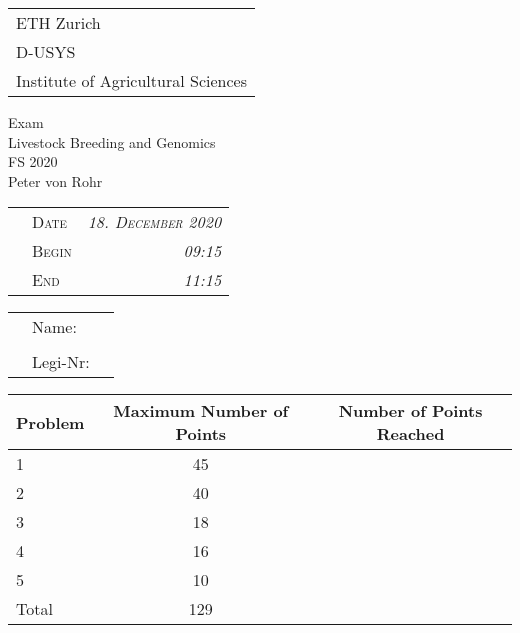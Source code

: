 \documentclass[
]{article}
\author{}
\date{\vspace{-2.5em}}
\begin{document}
\thispagestyle{empty}

\begin{tabular}{l}
ETH Zurich \\
D-USYS\\
Institute of Agricultural Sciences\\
\end{tabular}

\vspace{15ex}
\begin{center}
\huge
Exam\\ \vspace{1ex}
Livestock Breeding and Genomics \\  \vspace{1ex}
FS 2020 \\

\normalsize
\vspace{7ex}
Peter von Rohr 
\end{center}

\vspace{7ex}
\begin{tabular}{p{5cm}lr}
  & \textsc{Date}  & \textsc{\emph{18. December 2020}} \\
  & \textsc{Begin} & \textsc{\emph{09:15 }}\\
  & \textsc{End}   & \textsc{\emph{11:15 }}\\ 
\end{tabular}

\vspace{5ex}

\large
\begin{tabular}{p{2.5cm}p{3cm}p{6cm}}
  &  Name:     &  \\
  &            &  \\
  &  Legi-Nr:  & \\
\end{tabular}
\normalsize

\vspace{9ex}
\begin{center}
\begin{tabular}{|p{3cm}|c|c|}
\hline
Problem  &  Maximum Number of Points  &  Number of Points Reached \\
\hline
1        &  45         & \\
\hline
2        &  40         & \\
\hline
3        &  18         & \\
\hline
4        &  16          & \\
\hline
5        &  10          & \\
\hline
Total    &  129    & \\
\hline
\end{tabular}
\end{center}
\end{document}
